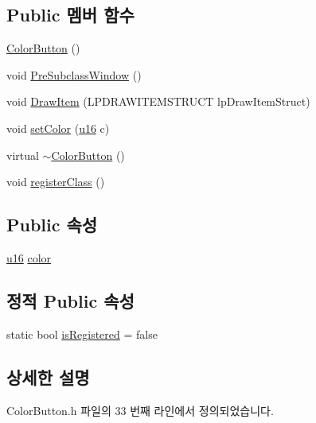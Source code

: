\subsection*{Public 멤버 함수}
\begin{DoxyCompactItemize}
\item 
\mbox{\hyperlink{class_color_button_a4b8e318941c5c69efd5a610fd7edb51e}{Color\+Button}} ()
\item 
void \mbox{\hyperlink{class_color_button_a2252acea0c111e198cc5bcc914e2cfeb}{Pre\+Subclass\+Window}} ()
\item 
void \mbox{\hyperlink{class_color_button_a48b973ebb6644f474f64ff1e8fbb1adf}{Draw\+Item}} (L\+P\+D\+R\+A\+W\+I\+T\+E\+M\+S\+T\+R\+U\+CT lp\+Draw\+Item\+Struct)
\item 
void \mbox{\hyperlink{class_color_button_a9ff5dc144a4acd5e2551ab94506b3bb0}{set\+Color}} (\mbox{\hyperlink{_system_8h_a9e6c91d77e24643b888dbd1a1a590054}{u16}} c)
\item 
virtual \mbox{\hyperlink{class_color_button_a992ff40e28cd869985afcf02ef338797}{$\sim$\+Color\+Button}} ()
\item 
void \mbox{\hyperlink{class_color_button_aabbc7306d4354479e0315b2a15026571}{register\+Class}} ()
\end{DoxyCompactItemize}
\subsection*{Public 속성}
\begin{DoxyCompactItemize}
\item 
\mbox{\hyperlink{_system_8h_a9e6c91d77e24643b888dbd1a1a590054}{u16}} \mbox{\hyperlink{class_color_button_ac2e59577aba7413fbf40c97f21df4835}{color}}
\end{DoxyCompactItemize}
\subsection*{정적 Public 속성}
\begin{DoxyCompactItemize}
\item 
static bool \mbox{\hyperlink{class_color_button_a77e2fa25affb19cac1c18594d5bc478f}{is\+Registered}} = false
\end{DoxyCompactItemize}


\subsection{상세한 설명}


Color\+Button.\+h 파일의 33 번째 라인에서 정의되었습니다.



